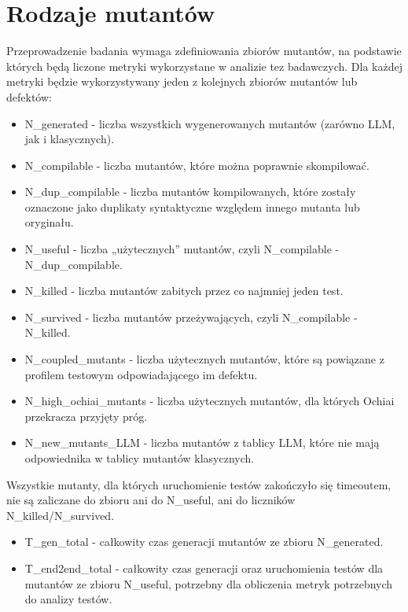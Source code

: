 \documentclass[12pt,a4paper,oldfontcommands]{memoir}
\theoremstyle{plain}
\theoremstyle{definition}
\theoremstyle{remark}
\begin{document}
    \section{Rodzaje mutantów}

    Przeprowadzenie badania wymaga zdefiniowania zbiorów mutantów, na podstawie których będą liczone metryki wykorzystane w analizie tez badawczych.
    Dla każdej metryki będzie wykorzystywany jeden z kolejnych zbiorów mutantów lub defektów:

    \begin{itemize}
        \item N\_generated - liczba wszystkich wygenerowanych mutantów (zarówno LLM, jak i klasycznych).
        \item N\_compilable - liczba mutantów, które można poprawnie skompilować.
        \item N\_dup\_compilable - liczba mutantów kompilowanych, które zostały oznaczone jako duplikaty syntaktyczne względem innego mutanta lub oryginału.
        \item N\_useful - liczba „użytecznych” mutantów, czyli N\_compilable - N\_dup\_compilable.
        \item N\_killed - liczba mutantów zabitych przez co najmniej jeden test.
        \item N\_survived - liczba mutantów przeżywających, czyli N\_compilable - N\_killed.
        \item N\_coupled\_mutants - liczba użytecznych mutantów, które są powiązane z profilem testowym odpowiadającego im defektu.
        \item N\_high\_ochiai\_mutants - liczba użytecznych mutantów, dla których Ochiai przekracza przyjęty próg.
        \item N\_new\_mutants\_LLM - liczba mutantów z tablicy LLM, które nie mają odpowiednika w tablicy mutantów klasycznych.
    \end{itemize}

    Wszystkie mutanty, dla których uruchomienie testów zakończyło się timeoutem, nie są zaliczane do zbioru ani do N\_useful, ani do liczników N\_killed/N\_survived.

    \begin{itemize}
        \item T\_gen\_total - całkowity czas generacji mutantów ze zbioru N\_generated.
        \item T\_end2end\_total - całkowity czas generacji oraz uruchomienia testów dla mutantów ze zbioru N\_useful, potrzebny dla obliczenia metryk potrzebnych do analizy testów.
    \end{itemize}
\end{document}
